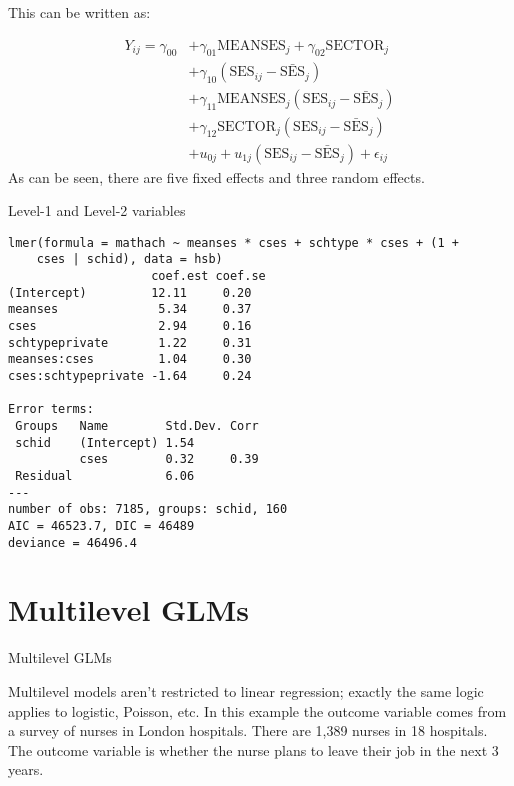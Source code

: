 \documentclass[10pt,ignorenonframetext,]{beamer}
\begin{document}
\begin{frame}{This can be written as:}

\[
\begin{aligned}
Y_{ij} = \gamma_{00} &+ \gamma_{01}\mathrm{MEANSES}_j + \gamma_{02}\mathrm{SECTOR}_j \\
        &+ \gamma_{10}(\mathrm{SES}_{ij}-\bar{\mathrm{SES}}_j)\\
    &+ \gamma_{11}\mathrm{MEANSES}_j(\mathrm{SES}_{ij}-\bar{\mathrm{SES}}_j)\\
    & + \gamma_{12}\mathrm{SECTOR}_j(\mathrm{SES}_{ij}-\bar{\mathrm{SES}}_j)\\
    &+  u_{0j} + u_{1j}(\mathrm{SES}_{ij}-\bar{\mathrm{SES}}_j) + \epsilon_{ij}
\end{aligned}
\] As can be seen, there are five fixed effects and three random
effects.

\end{frame}

\begin{frame}[fragile]{Level-1 and Level-2 variables}

\begin{verbatim}
lmer(formula = mathach ~ meanses * cses + schtype * cses + (1 + 
    cses | schid), data = hsb)
                    coef.est coef.se
(Intercept)         12.11     0.20  
meanses              5.34     0.37  
cses                 2.94     0.16  
schtypeprivate       1.22     0.31  
meanses:cses         1.04     0.30  
cses:schtypeprivate -1.64     0.24  

Error terms:
 Groups   Name        Std.Dev. Corr 
 schid    (Intercept) 1.54          
          cses        0.32     0.39 
 Residual             6.06          
---
number of obs: 7185, groups: schid, 160
AIC = 46523.7, DIC = 46489
deviance = 46496.4 
\end{verbatim}

\end{frame}

\section{Multilevel GLMs}\label{multilevel-glms}

\begin{frame}{Multilevel GLMs}

Multilevel models aren't restricted to linear regression; exactly the
same logic applies to logistic, Poisson, etc. In this example the
outcome variable comes from a survey of nurses in London hospitals.
There are 1,389 nurses in 18 hospitals. The outcome variable is whether
the nurse plans to leave their job in the next 3 years.

\end{frame}
\end{document}

